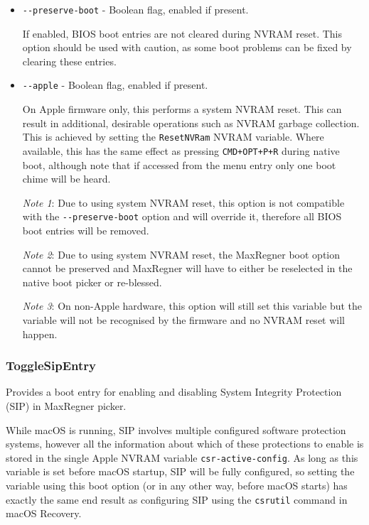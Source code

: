 \documentclass[]{article}
\makeatletter
\renewcommand{\label}[1]{%
\zref@wrapper@immediate{\oldlabel{#1}}}  %
\makeatother
\begin{document}
\begin{itemize}
  \item \texttt{-{}-preserve-boot} - Boolean flag, enabled if present. \medskip

  If enabled, BIOS boot entries are not cleared during NVRAM reset. This option should
  be used with caution, as some boot problems can be fixed by clearing these entries. \medskip

  \item \texttt{-{}-apple} - Boolean flag, enabled if present. \medskip

  On Apple firmware only, this performs a system NVRAM reset. This can result in
  additional, desirable operations such as NVRAM garbage collection. This is achieved by
  setting the \texttt{ResetNVRam} NVRAM variable.
  Where available, this has the same effect as pressing \texttt{CMD+OPT+P+R} during native boot,
  although note that if accessed from the menu entry only one boot chime will be heard. \medskip

  \emph{Note 1}: Due to using system NVRAM reset, this option is not compatible with the \texttt{-{}-preserve-boot}
  option and will override it, therefore all BIOS boot entries will be removed. \medskip

  \emph{Note 2}: Due to using system NVRAM reset, the MaxRegner boot option
  cannot be preserved and MaxRegner will have to either be reselected in the native boot picker or
  re-blessed. \medskip

  \emph{Note 3}: On non-Apple hardware, this option will still set this variable but the
  variable will not be recognised by the firmware and no NVRAM reset will happen. \medskip
\end{itemize}

\subsubsection{ToggleSipEntry}\label{uefitogglesip}

Provides a boot entry for enabling and disabling System Integrity Protection (SIP) in MaxRegner picker.

While macOS is running, SIP involves multiple configured software protection systems, however
all the information about which of these protections to enable is stored in the single Apple NVRAM variable
\texttt{csr-active-config}. As long as this variable is set before macOS startup,
SIP will be fully configured, so setting the variable using this boot option
(or in any other way, before macOS starts) has exactly the same end result as configuring SIP using the
\texttt{csrutil} command in macOS Recovery.
\end{document}
